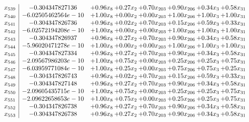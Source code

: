 \documentclass[8pt]{article}
\begin{document}
\[\begin{array}{c| c c@{\hskip 2pt} c@{\hskip 2pt} c@{\hskip 2pt} c@{\hskip 2pt} c@{\hskip 2pt} c@{\hskip 2pt} }
 x_{539}   &  -0.304347827136 & +  0.96 x_{8} & +  0.27 x_{2} & +  0.70 x_{203} & +  0.90 x_{206} & +  0.34 x_{3} & +  0.58 x_{31}\\
 x_{540}   &  -6.02505462564e-10 & +  1.00 x_{8} & +  0.00 x_{2} & +  0.00 x_{203} & +  1.00 x_{206} & +  1.00 x_{3} & +  1.00 x_{31}\\
 x_{541}   &  -0.304347826736 & +  0.96 x_{8} & +  0.02 x_{2} & +  0.70 x_{203} & +  0.15 x_{206} & +  0.59 x_{3} & +  0.33 x_{31}\\
 x_{542}   &  -6.02572194208e-10 & +  1.00 x_{8} & +  0.00 x_{2} & +  0.00 x_{203} & +  1.00 x_{206} & +  1.00 x_{3} & +  1.00 x_{31}\\
 x_{543}   &  -0.304347826937 & +  0.96 x_{8} & +  0.27 x_{2} & +  0.70 x_{203} & +  0.90 x_{206} & +  0.34 x_{3} & +  0.58 x_{31}\\
 x_{544}   &  -5.96020471278e-10 & +  1.00 x_{8} & +  0.00 x_{2} & +  0.00 x_{203} & +  1.00 x_{206} & +  1.00 x_{3} & +  1.00 x_{31}\\
 x_{545}   &  -0.304347827334 & +  0.96 x_{8} & +  0.27 x_{2} & +  0.70 x_{203} & +  0.90 x_{206} & +  0.34 x_{3} & +  0.58 x_{31}\\
 x_{546}   &  -2.09567986203e-10 & +  1.00 x_{8} & +  0.75 x_{2} & +  0.00 x_{203} & +  0.25 x_{206} & +  0.25 x_{3} & +  0.75 x_{31}\\
 x_{547}   &  -6.03959771084e-10 & +  1.00 x_{8} & +  0.25 x_{2} & +  0.00 x_{203} & +  0.75 x_{206} & +  0.75 x_{3} & +  0.25 x_{31}\\
 x_{548}   &  -0.304347826743 & +  0.96 x_{8} & +  0.02 x_{2} & +  0.70 x_{203} & +  0.15 x_{206} & +  0.59 x_{3} & +  0.33 x_{31}\\
 x_{549}   &  -0.304347827148 & +  0.96 x_{8} & +  0.27 x_{2} & +  0.70 x_{203} & +  0.90 x_{206} & +  0.34 x_{3} & +  0.58 x_{31}\\
 x_{550}   &  -2.09605435715e-10 & +  1.00 x_{8} & +  0.75 x_{2} & +  0.00 x_{203} & +  0.25 x_{206} & +  0.25 x_{3} & +  0.75 x_{31}\\
 x_{551}   &  -2.09622658653e-10 & +  1.00 x_{8} & +  0.75 x_{2} & +  0.00 x_{203} & +  0.25 x_{206} & +  0.25 x_{3} & +  0.75 x_{31}\\
 x_{552}   &  -0.304347826738 & +  0.96 x_{8} & +  0.27 x_{2} & +  0.70 x_{203} & +  0.90 x_{206} & +  0.34 x_{3} & +  0.58 x_{31}\\
 x_{553}   &  -0.304347826738 & +  0.96 x_{8} & +  0.27 x_{2} & +  0.70 x_{203} & +  0.90 x_{206} & +  0.34 x_{3} & +  0.58 x_{31}\\

\end{array}\]
\end{document}
